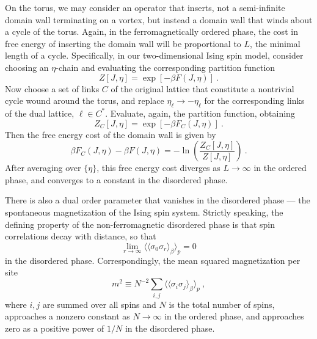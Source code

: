 On the torus, we may consider an operator that inserts, not a
semi-infinite domain wall terminating on a vortex, but instead a domain
wall that winds about a cycle of the torus.  Again, in the
ferromagnetically ordered phase, the cost in free energy of inserting
the domain wall will be proportional to $L$, the minimal length of a
cycle.  Specifically, in our two-dimensional
Ising spin model, consider choosing an $\eta$-chain and
evaluating the corresponding partition function
\begin{equation}
Z[J,\eta] = \exp [-\beta F(J,\eta)]~.
\end{equation}
Now choose a set of links $C$ of the original lattice that constitute a
nontrivial cycle wound around the torus, and replace $\eta_\ell
\rightarrow -\eta_\ell$ for the corresponding links of the dual lattice,
$\ell \in C^*$.  Evaluate, again, the partition function, obtaining
\begin{equation}
Z_C [J,\eta] = \exp [-\beta F_C (J,\eta)]~.
\end{equation}
Then the free energy cost of the domain wall is given by
\begin{equation}
\beta F_C (J,\eta) - \beta F(J,\eta) = - \ln \left(\frac{Z_C [J,\eta]}{Z [J,\eta]}\right)~.
\end{equation}
After averaging over $\{\eta\}$, this free energy cost diverges as $L\to\infty$ in the ordered phase, and converges to a constant in the disordered phase.

There is also a dual order parameter that vanishes in the disordered 
phase --- the spontaneous magnetization of the Ising spin system. Strictly speaking, the defining property of the non-ferromagnetic disordered phase is that spin correlations decay with distance, so that
\begin{equation}
\lim_{r\to \infty}\langle\langle \sigma_0\sigma_r\rangle_\beta\rangle_p=0
\end{equation}
in the disordered phase. Correspondingly, the mean squared magnetization per site
\begin{equation}
m^2\equiv N^{-2}\sum_{i,j}\langle\langle \sigma_i\sigma_j\rangle_\beta\rangle_p~,
\end{equation}
where $i,j$ are summed over all spins and $N$ is the total number of spins, approaches a nonzero constant as $N\to \infty$ in the ordered phase, and approaches zero as a positive power of $1/N$ in the disordered phase.

